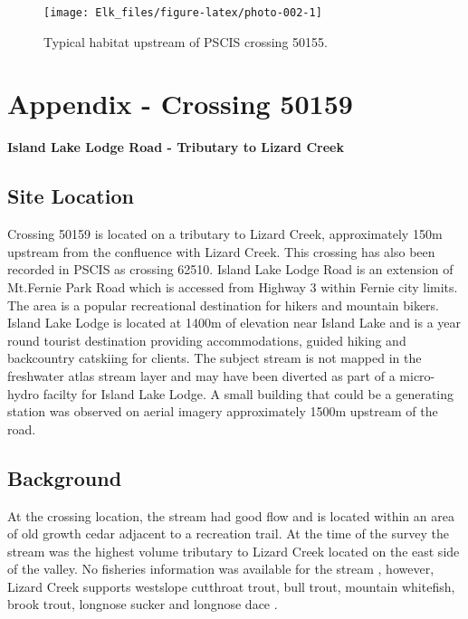 \documentclass[
]{book}
\begin{document}
\begin{figure}[!ht]
\texttt{[image: Elk\_files/figure-latex/photo-002-1]} \caption{Typical habitat upstream of PSCIS crossing 50155.}\label{fig:photo-002}
\end{figure}

\hypertarget{appendix---crossing-50159}{%
\chapter*{Appendix - Crossing 50159}\label{appendix---crossing-50159}}

\textbf{Island Lake Lodge Road - Tributary to Lizard Creek}

\hypertarget{site-location-1}{%
\section*{Site Location}\label{site-location-1}}

Crossing 50159 is located on a tributary to Lizard Creek, approximately 150m upstream from the confluence with Lizard Creek. This crossing has also been recorded in PSCIS as crossing 62510. Island Lake Lodge Road is an extension of Mt.Fernie Park Road which is accessed from Highway 3 within Fernie city limits. The area is a popular recreational destination for hikers and mountain bikers. Island Lake Lodge is located at 1400m of elevation near Island Lake and is a year round tourist destination providing accommodations, guided hiking and backcountry catskiing for clients. The subject stream is not mapped in the freshwater atlas stream layer and may have been diverted as part of a micro-hydro facilty for Island Lake Lodge. A small building that could be a generating station was observed on aerial imagery approximately 1500m upstream of the road.

\hypertarget{background-2}{%
\section*{Background}\label{background-2}}

At the crossing location, the stream had good flow and is located within an area of old growth cedar adjacent to a recreation trail. At the time of the survey the stream was the highest volume tributary to Lizard Creek located on the east side of the valley. No fisheries information was available for the stream \citep{moeStreamInventorySample}, however, Lizard Creek supports westslope cutthroat trout, bull trout, mountain whitefish, brook trout, longnose sucker and longnose dace \citep{data_fish_obs}.
\end{document}
